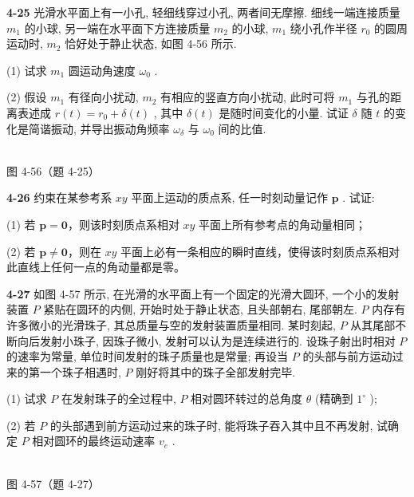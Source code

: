 \newpage

\textbf{4-25} 光滑水平面上有一小孔, 轻细线穿过小孔, 两者间无摩擦. 细线一端连接质量 $m_{1}$ 的小球, 另一端在水平面下方连接质量 $m_{2}$ 的小球, $m_{1}$ 绕小孔作半径 $r_{0}$ 的圆周运动时, $m_{2}$ 恰好处于静止状态, 如图 4-56 所示.

(1) 试求 $m_{1}$ 圆运动角速度 $\omega_{0}$ .

(2) 假设 $m_{1}$ 有径向小扰动, $m_{2}$ 有相应的竖直方向小扰动, 此时可将 $m_{1}$ 与孔的距离表述成 $r(t)=r_{0}+\delta(t)$ , 其中 $\delta(t)$ 是随时间变化的小量. 试证 $\delta$ 随 $t$ 的变化是简谐振动, 并导出振动角频率 $\omega_{\delta}$ 与 $\omega_{0}$ 间的比值.

\begin{center}
\resizebox{0.47\textwidth}{!}{}\\[4pt]
{\small 图 4-56（题 4-25）}
\end{center}

\newpage

\textbf{4-26} 约束在某参考系 $xy$ 平面上运动的质点系, 任一时刻动量记作 $\pmb{p}$ . 试证:

(1) 若 $\boldsymbol p=\boldsymbol 0$，则该时刻质点系相对 $xy$ 平面上所有参考点的角动量相同；

(2) 若 $\boldsymbol p \neq \boldsymbol 0$，则在 $xy$ 平面上必有一条相应的瞬时直线，使得该时刻质点系相对此直线上任何一点的角动量都是零。

\newpage

\textbf{4-27} 如图 4-57 所示, 在光滑的水平面上有一个固定的光滑大圆环, 一个小的发射装置 $P$ 紧贴在圆环的内侧, 开始时处于静止状态, 且头部朝右, 尾部朝左. $P$ 内存有许多微小的光滑珠子, 其总质量与空的发射装置质量相同. 某时刻起, $P$ 从其尾部不断向后发射小珠子, 因珠子微小, 发射可以认为是连续进行的. 设珠子射出时相对 $P$ 的速率为常量, 单位时间发射的珠子质量也是常量; 再设当 $P$ 的头部与前方运动过来的第一个珠子相遇时, $P$ 刚好将其中的珠子全部发射完毕.

(1) 试求 $P$ 在发射珠子的全过程中, $P$ 相对圆环转过的总角度 $\theta$ (精确到 $1^{\circ}$ );

(2) 若 $P$ 的头部遇到前方运动过来的珠子时, 能将珠子吞入其中且不再发射, 试确定 $P$ 相对圆环的最终运动速率 $v_{e}$ .

\begin{center}
\resizebox{0.32\textwidth}{!}{}\\[4pt]
{\small 图 4-57（题 4-27）}
\end{center}

